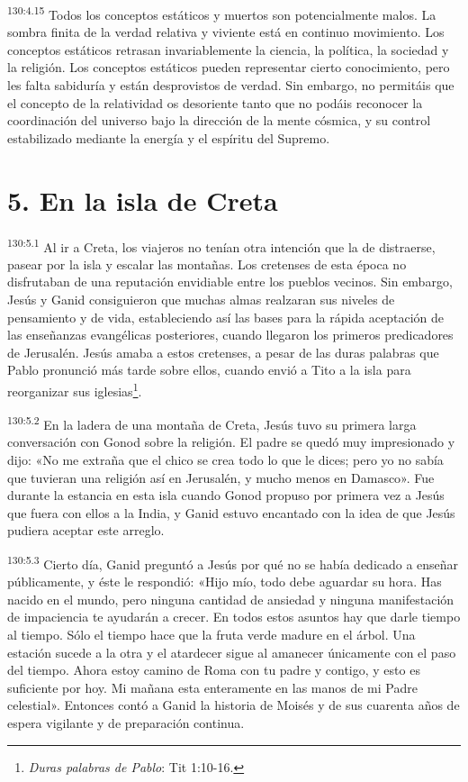 \par 
\textsuperscript{130:4.15} Todos los conceptos estáticos y muertos son potencialmente malos. La sombra finita de la verdad relativa y viviente está en continuo movimiento. Los conceptos estáticos retrasan invariablemente la ciencia, la política, la sociedad y la religión. Los conceptos estáticos pueden representar cierto conocimiento, pero les falta sabiduría y están desprovistos de verdad. Sin embargo, no permitáis que el concepto de la relatividad os desoriente tanto que no podáis reconocer la coordinación del universo bajo la dirección de la mente cósmica, y su control estabilizado mediante la energía y el espíritu del Supremo.

\section*{5. En la isla de Creta}
\par 
\textsuperscript{130:5.1} Al ir a Creta, los viajeros no tenían otra intención que la de distraerse, pasear por la isla y escalar las montañas. Los cretenses de esta época no disfrutaban de una reputación envidiable entre los pueblos vecinos. Sin embargo, Jesús y Ganid consiguieron que muchas almas realzaran sus niveles de pensamiento y de vida, estableciendo así las bases para la rápida aceptación de las enseñanzas evangélicas posteriores, cuando llegaron los primeros predicadores de Jerusalén. Jesús amaba a estos cretenses, a pesar de las duras palabras que Pablo pronunció más tarde sobre ellos, cuando envió a Tito a la isla para reorganizar sus iglesias\footnote{\textit{Duras palabras de Pablo}: Tit 1:10-16.}.

\par 
\textsuperscript{130:5.2} En la ladera de una montaña de Creta, Jesús tuvo su primera larga conversación con Gonod sobre la religión. El padre se quedó muy impresionado y dijo: «No me extraña que el chico se crea todo lo que le dices; pero yo no sabía que tuvieran una religión así en Jerusalén, y mucho menos en Damasco». Fue durante la estancia en esta isla cuando Gonod propuso por primera vez a Jesús que fuera con ellos a la India, y Ganid estuvo encantado con la idea de que Jesús pudiera aceptar este arreglo.

\par 
\textsuperscript{130:5.3} Cierto día, Ganid preguntó a Jesús por qué no se había dedicado a enseñar públicamente, y éste le respondió: «Hijo mío, todo debe aguardar su hora. Has nacido en el mundo, pero ninguna cantidad de ansiedad y ninguna manifestación de impaciencia te ayudarán a crecer. En todos estos asuntos hay que darle tiempo al tiempo. Sólo el tiempo hace que la fruta verde madure en el árbol. Una estación sucede a la otra y el atardecer sigue al amanecer únicamente con el paso del tiempo. Ahora estoy camino de Roma con tu padre y contigo, y esto es suficiente por hoy. Mi mañana esta enteramente en las manos de mi Padre celestial». Entonces contó a Ganid la historia de Moisés y de sus cuarenta años de espera vigilante y de preparación continua.

